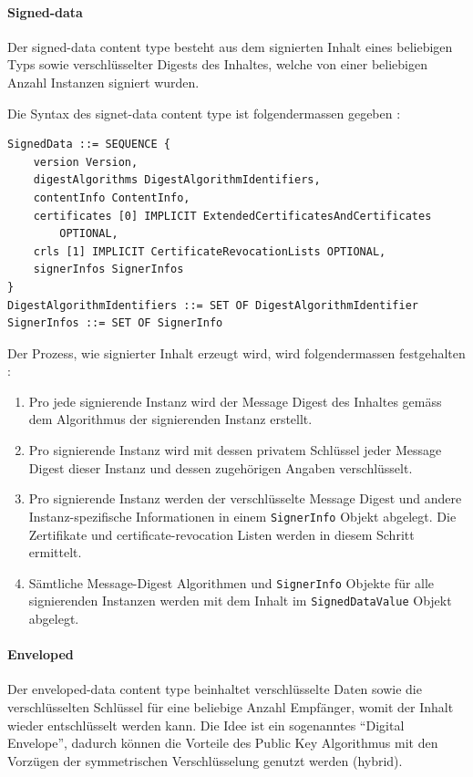 \documentclass[10pt,a4paper]{article}
\begin{document}
\paragraph{Signed-data}
Der signed-data content type besteht aus dem signierten Inhalt eines beliebigen Typs sowie
verschlüsselter Digests des Inhaltes, welche von einer beliebigen Anzahl Instanzen
signiert wurden.

Die Syntax des signet-data content type ist folgendermassen gegeben \cite[S.10]{pkcs7}:
\begin{verbatim}
SignedData ::= SEQUENCE {
    version Version,
    digestAlgorithms DigestAlgorithmIdentifiers,
    contentInfo ContentInfo,
    certificates [0] IMPLICIT ExtendedCertificatesAndCertificates
        OPTIONAL,
    crls [1] IMPLICIT CertificateRevocationLists OPTIONAL,
    signerInfos SignerInfos
}
DigestAlgorithmIdentifiers ::= SET OF DigestAlgorithmIdentifier
SignerInfos ::= SET OF SignerInfo
\end{verbatim}

Der Prozess, wie signierter Inhalt erzeugt wird, wird folgendermassen festgehalten
\cite[S.10]{pkcs7}:
\begin{enumerate}
    \item Pro jede signierende Instanz wird der Message Digest des Inhaltes gemäss dem
        Algorithmus der signierenden Instanz erstellt.
    \item Pro signierende Instanz wird mit dessen privatem Schlüssel jeder Message Digest
        dieser Instanz und dessen zugehörigen Angaben verschlüsselt.
    \item Pro signierende Instanz werden der verschlüsselte Message Digest und andere
        Instanz-spezifische Informationen in einem \texttt{SignerInfo} Objekt abgelegt.
        Die Zertifikate und certificate-revocation Listen werden in diesem Schritt
        ermittelt.
    \item Sämtliche Message-Digest Algorithmen und \texttt{SignerInfo} Objekte für alle
        signierenden Instanzen werden mit dem Inhalt im \texttt{SignedDataValue} Objekt
        abgelegt.
\end{enumerate}

\paragraph{Enveloped}
Der enveloped-data content type beinhaltet verschlüsselte Daten sowie die verschlüsselten
Schlüssel für eine beliebige Anzahl Empfänger, womit der Inhalt wieder entschlüsselt
werden kann. Die Idee ist ein sogenanntes "`Digital Envelope"', dadurch können die
Vorteile des Public Key Algorithmus mit den Vorzügen der symmetrischen Verschlüsselung
genutzt werden (hybrid).
\end{document}

